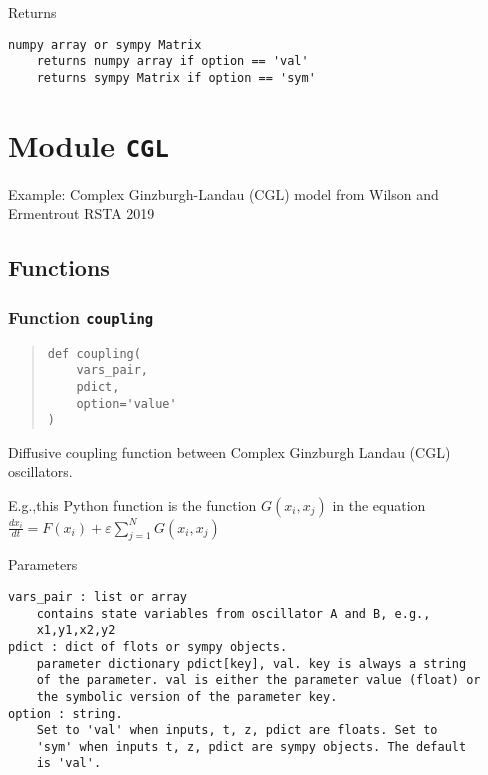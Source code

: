 \documentclass[english,a4paper,oneside]{article}
\begin{document}
Returns

\begin{verbatim}
numpy array or sympy Matrix
    returns numpy array if option == 'val'
    returns sympy Matrix if option == 'sym'
\end{verbatim}

\hypertarget{CGL}{%
\section{\texorpdfstring{Module \texttt{CGL}}{Module CGL}}\label{CGL}}

Example: Complex Ginzburgh-Landau (CGL) model from Wilson and Ermentrout
RSTA 2019

\hypertarget{functions-2}{%
\subsection{Functions}\label{functions-2}}

\hypertarget{CGL.coupling}{%
\subsubsection{\texorpdfstring{Function
\texttt{coupling}}{Function coupling}}\label{CGL.coupling}}

\begin{quote}
\begin{verbatim}
def coupling(
    vars_pair,
    pdict,
    option='value'
)
\end{verbatim}
\end{quote}

Diffusive coupling function between Complex Ginzburgh Landau (CGL)
oscillators.

E.g.,this Python function is the function \(G(x_i,x_j)\) in the equation
\(\frac{dx_i}{dt} = F(x_i) + \varepsilon \sum_{j=1}^N G(x_i,x_j)\)

Parameters

\begin{verbatim}
vars_pair : list or array
    contains state variables from oscillator A and B, e.g.,
    x1,y1,x2,y2
pdict : dict of flots or sympy objects.
    parameter dictionary pdict[key], val. key is always a string
    of the parameter. val is either the parameter value (float) or 
    the symbolic version of the parameter key.
option : string.
    Set to 'val' when inputs, t, z, pdict are floats. Set to
    'sym' when inputs t, z, pdict are sympy objects. The default
    is 'val'.
\end{verbatim}
\end{document}
